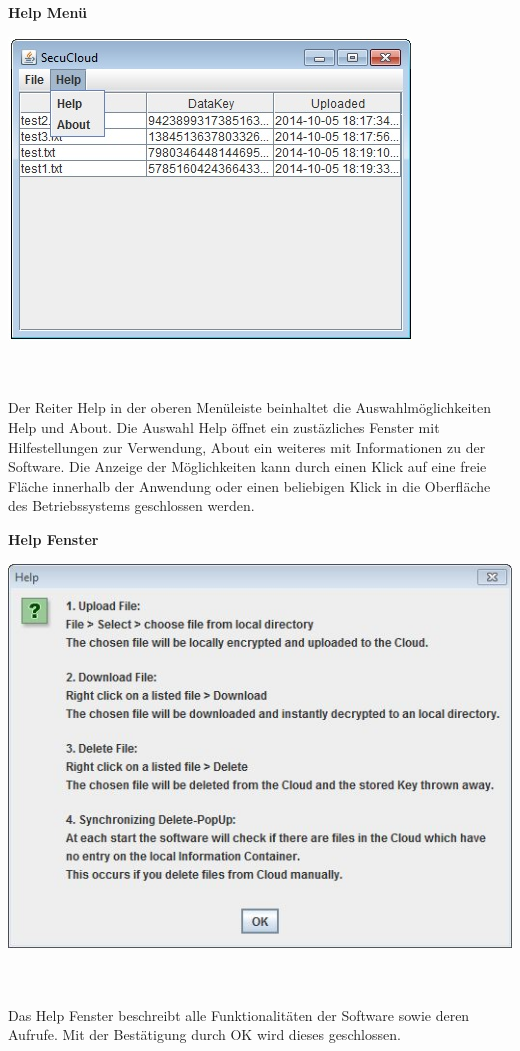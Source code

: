 \documentclass[12pt,a4paper,bibliography=totocnumbered,listof=totocnumbered]{scrartcl}
\begin{document}
\textbf{Help Menü}
\vspace{1em}
$\;$\\
\begin{minipage}{\linewidth}
	\centering
	\includegraphics[width=0.4\linewidth]{Help.jpg}
	\label{Help}
\end{minipage}
\\\\Der Reiter Help in der oberen Menüleiste beinhaltet die Auswahlmöglichkeiten Help und About. Die Auswahl Help öffnet ein zustäzliches Fenster mit Hilfestellungen zur Verwendung, About ein weiteres mit Informationen zu der Software. Die Anzeige der Möglichkeiten kann durch einen Klick auf eine freie Fläche innerhalb der Anwendung oder einen beliebigen Klick in die Oberfläche des Betriebssystems geschlossen werden.

\textbf{Help Fenster}
\vspace{1em}
$\;$\\
\begin{minipage}{\linewidth}
	\centering
	\includegraphics[width=0.4\linewidth]{HelpPopUp.jpg}
	\label{HelpPopUp}
\end{minipage}
\\\\Das Help Fenster beschreibt alle Funktionalitäten der Software sowie deren Aufrufe. Mit der Bestätigung durch OK wird dieses  geschlossen.
\end{document}
